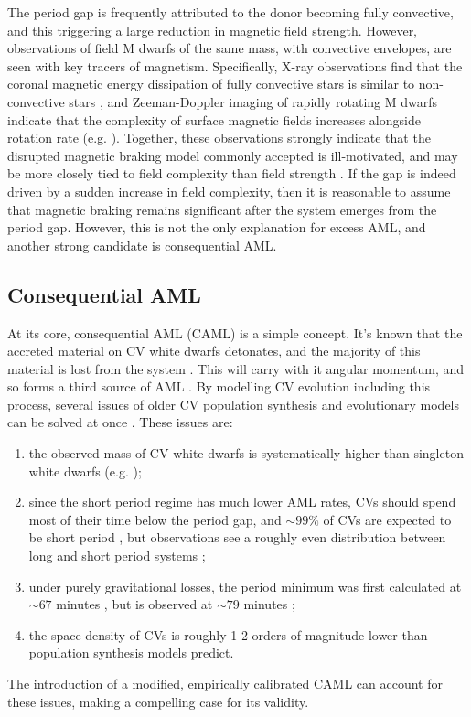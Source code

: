 The period gap is frequently attributed to the donor becoming fully convective, and this triggering a large reduction in magnetic field strength. However, observations of field M dwarfs of the same mass, with convective envelopes, are seen with key tracers of magnetism. Specifically, X-ray observations find that the coronal magnetic energy dissipation of fully convective stars is similar to non-convective stars \citep{wright2016}, and Zeeman-Doppler imaging of rapidly rotating M dwarfs indicate that the complexity of surface magnetic fields increases alongside rotation rate (e.g. \citealt{donati2003,donati2009,marsden2011,waite2011,waite2015}). Together, these observations strongly indicate that the disrupted magnetic braking model commonly accepted is ill-motivated, and may be more closely tied to field complexity than field strength \citep{garraffo2018}. If the gap is indeed driven by a sudden increase in field complexity, then it is reasonable to assume that magnetic braking remains significant after the system emerges from the period gap. However, this is not the only explanation for excess AML, and another strong candidate is consequential AML.


\subsection{Consequential AML}
\label{sect:introduction:CAML}

At its core, consequential AML (CAML) is a simple concept. It's known that the accreted material on CV white dwarfs detonates, and the majority of this material is lost from the system \citep{McAllister2019}. This will carry with it angular momentum, and so forms a third source of AML \citep{king1995,schenker1998}. By modelling CV evolution including this process, several issues of older CV population synthesis and evolutionary models can be solved at once \citep{Schreiber2016}. These issues are: 
\begin{enumerate}
    \item the observed mass of CV white dwarfs is systematically higher than singleton white dwarfs (e.g. \citealt{McAllister2019,pala2020});
    \item since the short period regime has much lower AML rates, CVs should spend most of their time below the period gap, and $\sim 99\%$ of CVs are expected to be short period \citep{kolb1993a}, but observations see a roughly even distribution between long and short period systems \citep{knigge2006};
    \item under purely gravitational losses, the period minimum was first calculated at $\sim 67$ minutes \citep{kolb99}, but is observed at $\sim 79$ minutes \citep{McAllister2019};
    \item the space density of CVs is roughly 1-2 orders of magnitude lower than population synthesis models predict.
\end{enumerate} 
The introduction of a modified, empirically calibrated CAML can account for these issues, making a compelling case for its validity. 

